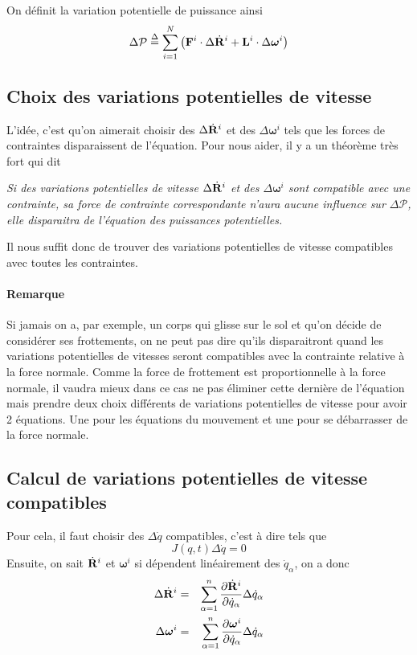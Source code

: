 \documentclass[11pt,a4paper]{article}
\newcommand\fv[1]{{\bf #1}} %
\newcommand\fvd[1]{\dot{\bf #1}} %
\newcommand\eqdef{\stackrel{\Delta}{=}}
\newcommand\omegaf{{\bm \omega}}
\newcommand\st{{\bf L}}
\newcommand\xgd{\ensuremath{\fvd{R}}}
\newcommand\qp{\dot{q}}
\newcommand\dqp{\Delta \dot{q}}
\begin{document}
On définit la variation potentielle de puissance ainsi
\[ \Delta \mathcal{P} \eqdef \sum_{i = 1}^N \left(\fv{F}^i \cdot \Delta \xgd^i + \st^i \cdot \Delta \omegaf^i\right) \]

\subsection{Choix des variations potentielles de vitesse}
L'idée, c'est qu'on aimerait choisir des $\Delta \xgd^i$ et des $\Delta \omegaf^i$ tels que les forces de contraintes disparaissent de l'équation.
Pour nous aider, il y a un théorème très fort qui dit
\begin{center}
	{\it
	Si des variations potentielles de vitesse $\Delta \xgd^i$ et des $\Delta \omegaf^i$ sont compatible avec une contrainte, sa force de contrainte correspondante n'aura aucune influence sur $\Delta \mathcal{P}$, elle disparaitra de l'équation des puissances potentielles.
	}
\end{center}

Il nous suffit donc de trouver des variations potentielles de vitesse compatibles avec toutes les contraintes.

\paragraph{Remarque}
Si jamais on a, par exemple, un corps qui glisse sur le sol et qu'on décide de considérer ses frottements,
on ne peut pas dire qu'ils disparaitront quand les variations potentielles de vitesses seront compatibles avec la contrainte relative à la force normale.
Comme la force de frottement est proportionnelle à la force normale, il vaudra mieux dans ce cas ne pas éliminer cette dernière de l'équation mais prendre deux choix différents de variations potentielles de vitesse pour avoir 2 équations.
Une pour les équations du mouvement et une pour se débarrasser de la force normale.

\subsection{Calcul de variations potentielles de vitesse compatibles}
Pour cela, il faut choisir des $\dqp$ compatibles, c'est à dire tels que
\[ J(q, t) \dqp = 0 \]
Ensuite, on sait $\xgd^i$ et $\omegaf^i$ si dépendent linéairement des $\qp_\alpha$, on a donc
\begin{eqnarray*}
	\Delta \xgd^i &=& \sum_{\alpha = 1}^n \frac{\partial \xgd^i}{\partial \qp_\alpha} \dqp_\alpha\\
	\Delta \omegaf^i &=& \sum_{\alpha = 1}^n \frac{\partial \omegaf^i}{\partial \qp_\alpha} \dqp_\alpha
\end{eqnarray*}
\end{document}
